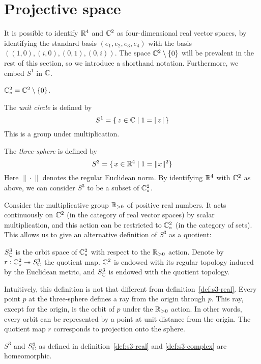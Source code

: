 \section{Projective space}
\label{sec:projective-space}
It is possible to identify $\mathbb{R}^4$ and $\mathbb{C}^2$ as four-dimensional real vector spaces,
by identifying the standard basis $(e_1, e_2, e_3, e_4)$ with the basis $((1, 0), (i, 0), (0, 1), (0, i))$.
The space $\mathbb{C}^2 \setminus \{ 0 \}$ will be prevalent in the rest of this section,
so we introduce a shorthand notation. Furthermore, we embed $S^1$ in $\mathbb{C}$.

$\mathbb{C}^2_\circ = \mathbb{C}^2 \setminus \{ 0 \}$.

The \emph{unit circle} is defined by
\[ S^1 = \{  \, z \in \mathbb{C} \mid 1 = |\,z\,| \,  \} \]
This is a group under multiplication.

The \emph{three-sphere} is defined by
\[ S^3 = \{  \, x \in \mathbb{R}^4 \mid 1 = \|x\|^2  \} \]
Here $\|{}\cdot{}\|$ denotes the regular Euclidean norm.
By identifying $\mathbb{R}^4$ with $\mathbb{C}^2$ as above,
we can consider $S^3$ to be a subset of $\mathbb{C}^2_\circ$.

Consider the multiplicative group $\mathbb{R}_{>0}$ of positive real numbers.
It acts continuously on $\mathbb{C}^2$ (in the category of real vector spaces) by scalar multiplication,
and this action can be restricted to $\mathbb{C}^2_\circ$ (in the category of sets).
This allows us to give an alternative definition of $S^3$ as a quotient:

$S^3_{\mathbb{C}}$ is the orbit space of $\mathbb{C}^2_\circ$ with respect to the $\mathbb{R}_{>0}$ action.
Denote by $r : \mathbb{C}^2_\circ \twoheadrightarrow S^3_{\mathbb{C}}$ the quotient map.
$\mathbb{C}^2$ is endowed with its regular topology induced by the Euclidean metric,
and $S^3_{\mathbb{C}}$ is endowed with the quotient topology.

Intuitively, this definition is not that different from definition~\ref{def:s3-real}.
Every point $p$ at the three-sphere defines a ray from the origin through $p$.
This ray, except for the origin, is the orbit of $p$ under the $\mathbb{R}_{>0}$ action.
In other words, every orbit can be represented by a point at unit distance from the origin.
The quotient map $r$ corresponds to projection onto the sphere.

$S^3$ and $S^3_{\mathbb{C}}$ as defined in definition~\ref{def:s3-real} and \ref{def:s3-complex} are homeomorphic.

